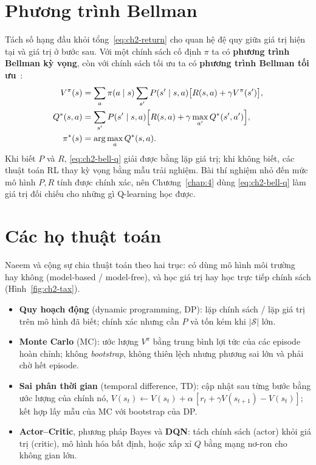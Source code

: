 \section{Phương trình Bellman}

Tách số hạng đầu khỏi tổng~\eqref{eq:ch2-return} cho quan hệ đệ quy giữa giá trị hiện tại và giá trị ở bước sau.
Với một chính sách cố định $\pi$ ta có \textbf{phương trình Bellman kỳ vọng}, còn với chính sách tối ưu ta có
\textbf{phương trình Bellman tối ưu}~\cite{ch2:naeem,ch2:sutton}:
\begin{align}
V^{\pi}(s)&=\sum_{a}\pi(a\mid s)\sum_{s'}P(s'\mid s,a)\big[R(s,a)+\gamma V^{\pi}(s')\big],\label{eq:ch2-bell-v}\\
Q^{*}(s,a)&=\sum_{s'}P(s'\mid s,a)\Big[R(s,a)+\gamma\max_{a'}Q^{*}(s',a')\Big],\label{eq:ch2-bell-q}\\
\pi^{*}(s)&=\arg\max_{a}Q^{*}(s,a).\notag
\end{align}
Khi biết $P$ và $R$, \eqref{eq:ch2-bell-q} giải được bằng lặp giá trị; khi không biết, các thuật toán RL thay kỳ vọng
bằng mẫu trải nghiệm. Bài thí nghiệm nhỏ đến mức mô hình $P,R$ tính được chính xác, nên Chương~\ref{chap:4} dùng
\eqref{eq:ch2-bell-q} làm giá trị đối chiếu cho những gì Q-learning học được.

\section{Các họ thuật toán}

Naeem và cộng sự chia thuật toán theo hai trục: có dùng mô hình môi trường hay không (model-based /
model-free), và học giá trị hay học trực tiếp chính sách (Hình~\ref{fig:ch2-tax}).


\begin{itemize}
\item \textbf{Quy hoạch động} (dynamic programming, DP): lặp chính sách / lặp giá trị trên mô hình đã biết; chính xác
nhưng cần $P$ và tốn kém khi $|\mathcal S|$ lớn.
\item \textbf{Monte Carlo} (MC): ước lượng $V^\pi$ bằng trung bình lợi tức của các episode hoàn chỉnh; không
\emph{bootstrap}, không thiên lệch nhưng phương sai lớn và phải chờ hết episode.
\item \textbf{Sai phân thời gian} (temporal difference, TD): cập nhật sau từng bước bằng ước lượng của chính nó,
$V(s_t)\leftarrow V(s_t)+\alpha\,[r_t+\gamma V(s_{t+1})-V(s_t)]$; kết hợp lấy mẫu của MC với bootstrap của DP.
\item \textbf{Actor--Critic}, phương pháp Bayes và \textbf{DQN}: tách chính sách (actor) khỏi giá trị (critic), mô hình
hóa bất định, hoặc xấp xỉ $Q$ bằng mạng nơ-ron cho không gian lớn.
\end{itemize}

